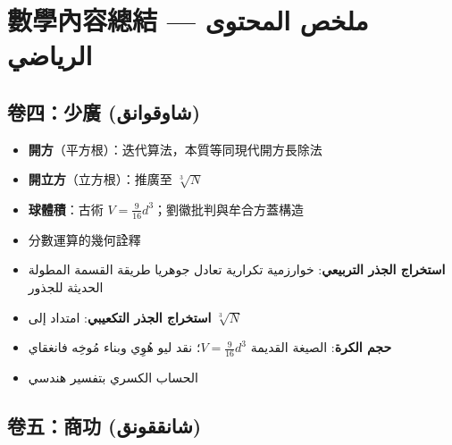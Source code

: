 \documentclass[11pt,a4paper]{article}
\newcommand{\ar}[1]{\arabicfont\beginR #1\endR}
\begin{document}
\newpage

\section*{數學內容總結 — \ar{ملخص المحتوى الرياضي}}

\subsection*{卷四：少廣 (شاوقوانق)}

\noindent
\begin{minipage}[t]{0.48\textwidth}
\begin{itemize}[leftmargin=1.2em,topsep=1pt,itemsep=1pt]
  \item \textbf{開方}（平方根）：迭代算法，本質等同現代開方長除法
  \item \textbf{開立方}（立方根）：推廣至 $\sqrt[3]{N}$
  \item \textbf{球體積}：古術 $V = \frac{9}{16}d^3$；劉徽批判與牟合方蓋構造
  \item 分數運算的幾何詮釋
\end{itemize}
\end{minipage}
\hfill
\begin{minipage}[t]{0.48\textwidth}
\arabicfont\beginR
\begin{itemize}[leftmargin=1.2em,topsep=1pt,itemsep=1pt]
  \item \textbf{استخراج الجذر التربيعي}: خوارزمية تكرارية تعادل جوهريا طريقة القسمة المطولة الحديثة للجذور
  \item \textbf{استخراج الجذر التكعيبي}: امتداد إلى $\sqrt[3]{N}$
  \item \textbf{حجم الكرة}: الصيغة القديمة $V = \frac{9}{16}d^3$؛ نقد ليو هُوِي وبناء مُوخِه فانغقاي
  \item الحساب الكسري بتفسير هندسي
\end{itemize}
\endR
\end{minipage}

\subsection*{卷五：商功 (شانققونق)}
\end{document}
